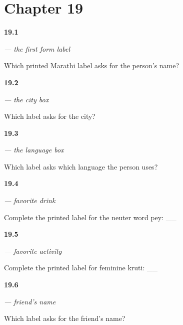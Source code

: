 \section*{Chapter 19}

\noindent\begin{minipage}[t]{\linewidth}
\raggedright
\hypertarget{review-MR-A1F01-naav-check}{\textbf{19.1}} \emph{ — the first form label}\par
\small Which printed Marathi label asks for the person's name?
\end{minipage}\par\medskip

\noindent\begin{minipage}[t]{\linewidth}
\raggedright
\hypertarget{review-MR-A1F01-shahar-check}{\textbf{19.2}} \emph{ — the city box}\par
\small Which label asks for the city?
\end{minipage}\par\medskip

\noindent\begin{minipage}[t]{\linewidth}
\raggedright
\hypertarget{review-MR-A1F01-bhasha-check}{\textbf{19.3}} \emph{ — the language box}\par
\small Which label asks which language the person uses?
\end{minipage}\par\medskip

\noindent\begin{minipage}[t]{\linewidth}
\raggedright
\hypertarget{review-MR-A1F01-avdate-pey-check}{\textbf{19.4}} \emph{  — favorite drink}\par
\small Complete the printed label for the neuter word pey: \_\_ 
\end{minipage}\par\medskip

\noindent\begin{minipage}[t]{\linewidth}
\raggedright
\hypertarget{review-MR-A1F01-avadti-kruti-check}{\textbf{19.5}} \emph{  — favorite activity}\par
\small Complete the printed label for feminine kruti: \_\_ 
\end{minipage}\par\medskip

\noindent\begin{minipage}[t]{\linewidth}
\raggedright
\hypertarget{review-MR-A1F01-mitrache-naav-check}{\textbf{19.6}} \emph{  — friend's name}\par
\small Which label asks for the friend's name?
\end{minipage}\par\medskip

